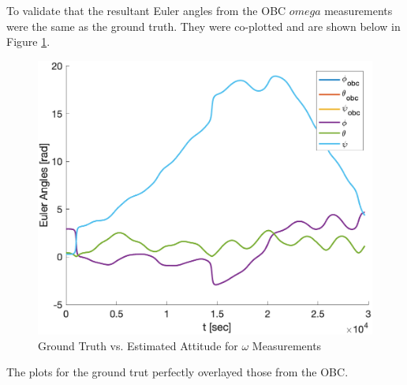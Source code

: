 To validate that the resultant Euler angles from the OBC $omega$ measurements were the same as the ground truth. They were co-plotted and are shown below in Figure \ref{fig:obcVsGroundOmega}.

\begin{figure}[H]
    \centering
    \includegraphics[width = 12cm]{Images/PS6/obcVsGroundOmegas.png}
    \caption{Ground Truth vs. Estimated Attitude for $\omega$ Measurements}
    \label{fig:obcVsGroundOmega}
\end{figure}

The plots for the ground trut perfectly overlayed those from the OBC.